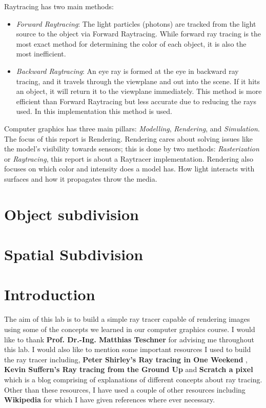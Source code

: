 \documentclass[11pt,a4paper]{article}
\begin{document}
	\vspace*{5px}
	Raytracing has two main methods: 
	\begin{itemize}
		\item 		\textit{Forward Raytracing}: The light particles (photons) are tracked from the light source to the object via Forward Raytracing. While forward ray tracing is the most exact method for determining the color of each object, it is also the most inefficient.
		\item 		\textit{Backward Raytracing}: 
		An eye ray is formed at the eye in backward ray tracing, and it travels through the viewplane and out into the scene. If it hits an object, it will return it to the viewplane immediately. This method is more efficient than Forward Raytracing but less accurate due to reducing the rays used. In this implementation this method is used.
	\end{itemize}
	
	Computer graphics has three main pillars: \textit{Modelling}, \textit{Rendering}, and \textit{Simulation}. The focus of this report is Rendering. Rendering cares about solving issues like the model's visibility towards sensors; this is done by two methods: \textit{Rasterization} or \textit{Raytracing}, this report is about a Raytracer implementation. Rendering also focuses on which color and intensity does a model has. How light interacts with surfaces and how it propagates throw the media.
	\section{Object subdivision}
	\section{Spatial Subdivision}
	
	
	\section{Introduction}
	The aim of this lab is to build a simple ray tracer capable of rendering images using some of the concepts we learned in our computer graphics course. I would like to thank \textbf{Prof. Dr.-Ing. Matthias Teschner} for advising me throughout this lab. I would also like to mention some important resources I used to build the ray tracer including, \textbf{Peter Shirley's Ray tracing in One Weekend} \cite{Shirley2020RTW1}, \textbf{Kevin Suffern's Ray tracing from the Ground Up} \cite{suffern2016ray} and \textbf{Scratch a pixel} \cite{scratchapixel} which is a blog comprising of explanations of different concepts about ray tracing. Other than these resources, I have used a couple of other resources including \textbf{Wikipedia} for which I have given references where ever necessary.
	
\end{document}
